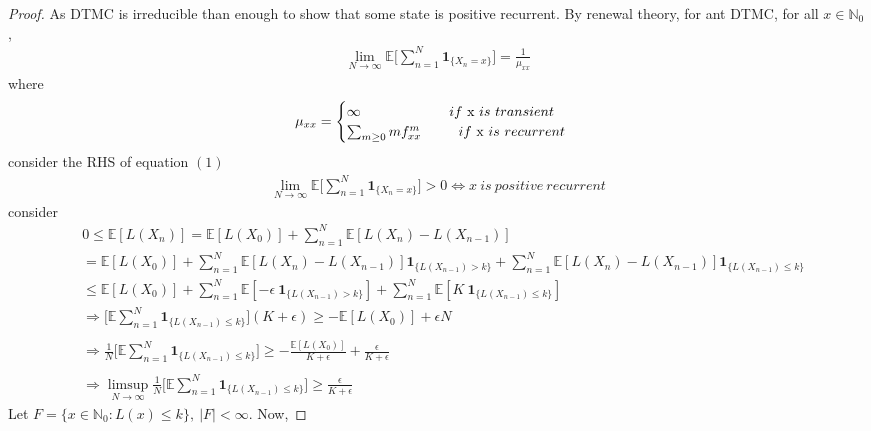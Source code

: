 \documentclass[a4paper,10pt,english]{article}
\begin{document}
\begin{proof}
As DTMC is irreducible than enough to show that some state is positive recurrent.
By renewal theory, for ant DTMC, for all $x \in \mathbb{N}_0$,
\begin{align}
\lim\limits_{N \rightarrow \infty} \mathbb{E}\Big[ \sum_{n=1}^{N} \boldsymbol{1}_{\{X_n=x\}} \Big] = \frac{1}{\mu _{xx}} 
\end{align}
where 
\begin{equation*}
\mu _{xx}=
\begin{cases}
	\infty \ \ \ \ \ \ \ \ \ \ \ \ \ \ \ \ \ \ \ if \ $x$ \ is \ transient\\
	\sum_{m \geq 0}m f^{m}_{xx} \ \ \ \ \ \ \ \ if \ $x$ \ is \ recurrent \\
\end{cases}
\end{equation*}
consider the RHS of equation $(1)$
\begin{align*}
\lim\limits_{N \rightarrow \infty} \mathbb{E}\Big[ \sum_{n=1}^{N} \boldsymbol{1}_{\{X_n=x\}} \Big] > 0 \Longleftrightarrow x \ is \ positive \ recurrent  
\end{align*}
consider
\begin{align*}
& 0 \leq \mathbb{E}[L(X_n)] = \mathbb{E}[L(X_0)] +   \sum_{n=1}^{N}\mathbb{E}[L(X_n)-L(X_{n-1})]\\
&= \mathbb{E}[L(X_0)] + \sum_{n=1}^{N}\mathbb{E}[L(X_n)-L(X_{n-1})]\boldsymbol{1}_{\{L(X_{n-1})>k\}} + \sum_{n=1}^{N}\mathbb{E}[L(X_n)-L(X_{n-1})]\boldsymbol{1}_{\{L(X_{n-1})\leq k\}}\\
&\leq \mathbb{E}[L(X_0)] + \sum_{n=1}^{N}\mathbb{E}[-\epsilon \        \boldsymbol{1}_{\{L(X_{n-1})>k\}}] + \sum_{n=1}^{N}\mathbb{E}[K \ \boldsymbol{1}_{\{L(X_{n-1})\leq k\}}]\\
&\Rightarrow \Bigg[\mathbb{E}\sum_{n=1}^{N} \boldsymbol{1}_{\{L(X_{n-1})\leq k\}}\Bigg](K + \epsilon) \geq -\mathbb{E}[L(X_0)] + \epsilon N\\\\
&\Rightarrow \frac{1}{N} \Bigg[\mathbb{E}\sum_{n=1}^{N} \boldsymbol{1}_{\{L(X_{n-1})\leq k\}}\Bigg] \geq -\frac{\mathbb{E}[L(X_0)]}{K+\epsilon} + \frac{\epsilon}{K+\epsilon}\\\\
&\Rightarrow \limsup_{N\rightarrow \infty}\frac{1}{N} \Bigg[\mathbb{E}\sum_{n=1}^{N} \boldsymbol{1}_{\{L(X_{n-1})\leq k\}}\Bigg] \geq \frac{\epsilon}{K+\epsilon}
\end{align*}
Let $F = \{x \in \mathbb{N}_0: L(x) \leq k\}, \ |F| < \infty$. Now,

\end{proof}
\end{document}
